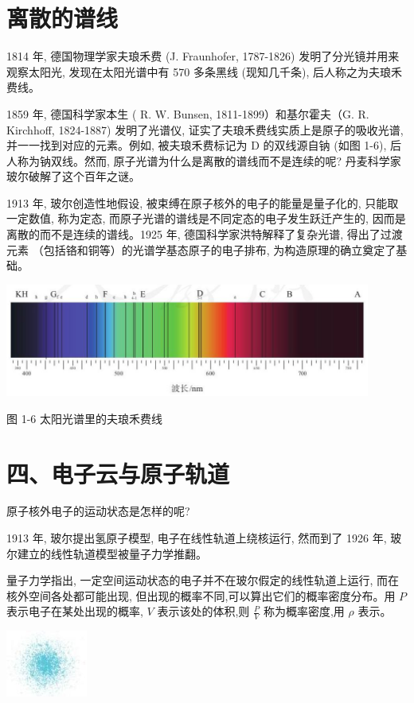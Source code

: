 \documentclass[10pt]{article}
\begin{document}
\section*{离散的谱线}

1814 年, 德国物理学家夫琅禾费 (J. Fraunhofer, 1787-1826) 发明了分光镜并用来观察太阳光, 发现在太阳光谱中有 570 多条黑线 (现知几千条), 后人称之为夫琅禾费线。

1859 年, 德国科学家本生 ( R. W. Bunsen, 1811-1899）和基尔霍夫（G. R. Kirchhoff, 1824-1887) 发明了光谱仪, 证实了夫琅禾费线实质上是原子的吸收光谱, 并一一找到对应的元素。例如, 被夫琅禾费标记为 \(\mathrm{D}\) 的双线源自钠 (如图 1-6), 后人称为钠双线。然而, 原子光谱为什么是离散的谱线而不是连续的呢? 丹麦科学家玻尔破解了这个百年之谜。

1913 年, 玻尔创造性地假设, 被束缚在原子核外的电子的能量是量子化的, 只能取一定数值, 称为定态, 而原子光谱的谱线是不同定态的电子发生跃迁产生的, 因而是离散的而不是连续的谱线。1925 年, 德国科学家洪特解释了复杂光谱, 得出了过渡元素 （包括铬和铜等）的光谱学基态原子的电子排布, 为构造原理的确立奠定了基础。

\begin{center}
\includegraphics[max width=0.9\textwidth]{images/0190e026-5a11-7df7-bd27-54d09026ba7a_14_685798.jpg}
\end{center}

图 1-6 太阳光谱里的夫琅禾费线

\section*{四、电子云与原子轨道}

原子核外电子的运动状态是怎样的呢?

1913 年, 玻尔提出氢原子模型, 电子在线性轨道上绕核运行, 然而到了 1926 年, 玻尔建立的线性轨道模型被量子力学推翻。

量子力学指出, 一定空间运动状态的电子并不在玻尔假定的线性轨道上运行, 而在核外空间各处都可能出现, 但出现的概率不同,可以算出它们的概率密度分布。用 \(P\) 表示电子在某处出现的概率, \(V\) 表示该处的体积,则 \(\frac{P}{V}\) 称为概率密度,用 \(\rho\) 表示。

\begin{center}
\includegraphics[max width=0.2\textwidth]{images/0190e026-5a11-7df7-bd27-54d09026ba7a_15_444444.jpg}
\end{center}
\end{document}
